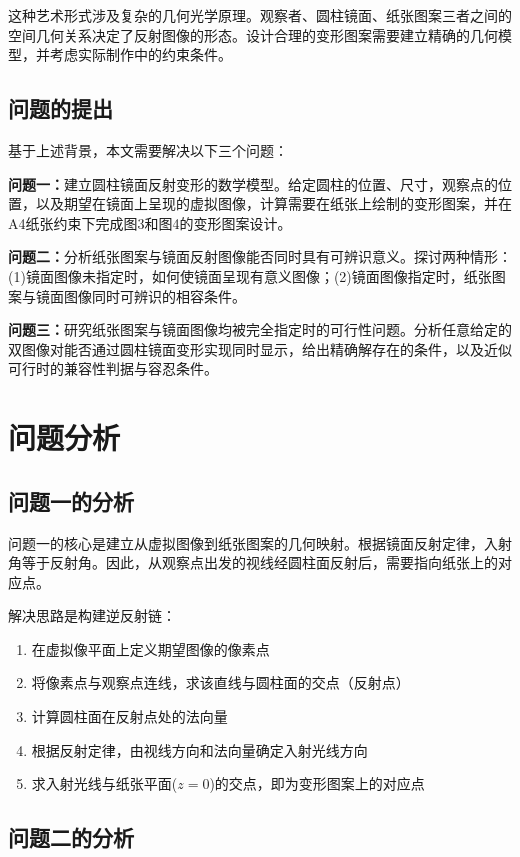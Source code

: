 \documentclass[withoutpreface]{cumcmthesis}
\begin{document}
这种艺术形式涉及复杂的几何光学原理。观察者、圆柱镜面、纸张图案三者之间的空间几何关系决定了反射图像的形态。设计合理的变形图案需要建立精确的几何模型，并考虑实际制作中的约束条件。

\subsection{问题的提出}

基于上述背景，本文需要解决以下三个问题：

\textbf{问题一：}建立圆柱镜面反射变形的数学模型。给定圆柱的位置、尺寸，观察点的位置，以及期望在镜面上呈现的虚拟图像，计算需要在纸张上绘制的变形图案，并在A4纸张约束下完成图3和图4的变形图案设计。

\textbf{问题二：}分析纸张图案与镜面反射图像能否同时具有可辨识意义。探讨两种情形：(1)镜面图像未指定时，如何使镜面呈现有意义图像；(2)镜面图像指定时，纸张图案与镜面图像同时可辨识的相容条件。

\textbf{问题三：}研究纸张图案与镜面图像均被完全指定时的可行性问题。分析任意给定的双图像对能否通过圆柱镜面变形实现同时显示，给出精确解存在的条件，以及近似可行时的兼容性判据与容忍条件。

\section{问题分析}

\subsection{问题一的分析}

问题一的核心是建立从虚拟图像到纸张图案的几何映射。根据镜面反射定律，入射角等于反射角。因此，从观察点出发的视线经圆柱面反射后，需要指向纸张上的对应点。

解决思路是构建逆反射链：
\begin{enumerate}
    \item 在虚拟像平面上定义期望图像的像素点
    \item 将像素点与观察点连线，求该直线与圆柱面的交点（反射点）
    \item 计算圆柱面在反射点处的法向量
    \item 根据反射定律，由视线方向和法向量确定入射光线方向
    \item 求入射光线与纸张平面($z=0$)的交点，即为变形图案上的对应点
\end{enumerate}

\subsection{问题二的分析}
\end{document}
